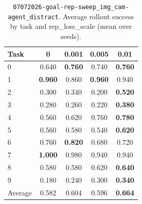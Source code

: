 
\begin{table}
\caption{\texttt{07072026-goal-rep-sweep\_img\_cam-agent\_distract}. Average rollout success by task and rep\_loss\_scale (mean over seeds).}
\label{tab:07072026_goal_rep_sweep_img_cam_agent_distract_rep_loss_success}
\begin{tabular}{lcccc}
\toprule
Task & 0 & 0.001 & 0.005 & 0.01 \\
\midrule
0 & 0.640 & \textbf{0.760} & 0.740 & \textbf{0.760} \\
1 & \textbf{0.960} & 0.860 & \textbf{0.960} & 0.940 \\
2 & 0.300 & 0.340 & 0.200 & \textbf{0.520} \\
3 & 0.280 & 0.260 & 0.220 & \textbf{0.380} \\
4 & 0.560 & 0.620 & 0.760 & \textbf{0.780} \\
5 & 0.560 & 0.580 & 0.540 & \textbf{0.620} \\
6 & 0.760 & \textbf{0.820} & 0.680 & 0.720 \\
7 & \textbf{1.000} & 0.980 & 0.940 & 0.940 \\
8 & 0.580 & 0.580 & 0.620 & \textbf{0.640} \\
9 & 0.180 & 0.240 & 0.300 & \textbf{0.340} \\
\midrule
Average & 0.582 & 0.604 & 0.596 & \textbf{0.664} \\
\bottomrule
\end{tabular}
\end{table}



